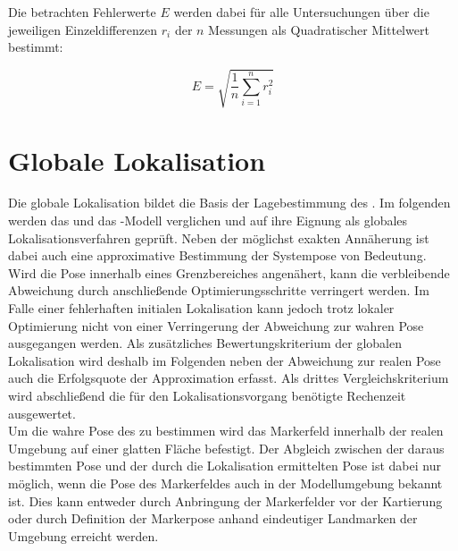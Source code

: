 Die betrachten Fehlerwerte $E$ werden dabei für alle Untersuchungen über die jeweiligen Einzeldifferenzen $r_i$ der $n$ Messungen als Quadratischer Mittelwert bestimmt:

\begin{equation}
E = \sqrt{\frac{1}{n}\sum_{i=1}^nr_i^2}
\end{equation}


\section{Globale Lokalisation}
Die globale Lokalisation bildet die Basis der Lagebestimmung des . Im folgenden werden das \red[Raycasting-] und das \red[Endpoint]-Modell verglichen und auf ihre Eignung als globales Lokalisationsverfahren geprüft. Neben der möglichst exakten Annäherung ist dabei auch eine approximative Bestimmung der Systempose von Bedeutung. Wird die Pose innerhalb eines Grenzbereiches angenähert, kann die verbleibende Abweichung durch anschließende Optimierungsschritte verringert werden. Im Falle einer fehlerhaften initialen Lokalisation kann jedoch trotz lokaler Optimierung nicht von einer Verringerung der Abweichung zur wahren Pose ausgegangen werden. Als zusätzliches Bewertungskriterium der globalen Lokalisation wird deshalb im Folgenden neben der Abweichung zur realen Pose auch die Erfolgsquote der Approximation erfasst. Als drittes Vergleichskriterium wird abschließend die für den Lokalisationsvorgang benötigte Rechenzeit ausgewertet.\\


Um die wahre Pose des  zu bestimmen wird das Markerfeld innerhalb der realen Umgebung auf einer glatten Fläche befestigt. Der Abgleich zwischen der daraus bestimmten Pose und der durch die Lokalisation ermittelten Pose ist dabei nur möglich, wenn die Pose des Markerfeldes auch in der Modellumgebung bekannt ist. Dies kann entweder durch Anbringung der Markerfelder vor der Kartierung oder durch Definition der Markerpose anhand eindeutiger Landmarken der Umgebung erreicht werden.\\

